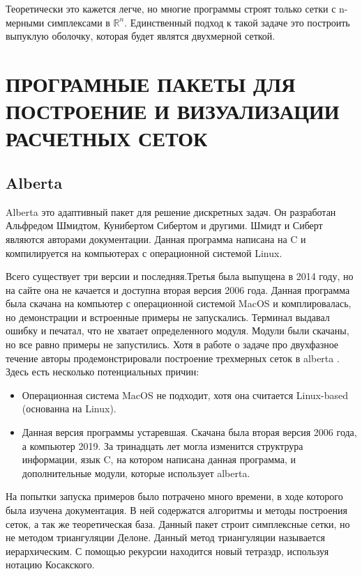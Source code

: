 Теоретически это кажется легче, но многие программы строят только сетки с n-мерными симплексами в $\mathbb{R}^{n}$. Единственный подход к такой задаче это построить выпуклую оболочку, которая будет являтся двухмерной сеткой. 

\chapter{ПРОГРАМНЫЕ ПАКЕТЫ ДЛЯ ПОСТРОЕНИЕ И ВИЗУАЛИЗАЦИИ РАСЧЕТНЫХ СЕТОК}
\section{Alberta}

Alberta это адаптивный пакет для решение дискретных задач. Он разработан Альфредом Шмидтом, Кунибертом Сибертом и другими. Шмидт и Сиберт являются авторами документации\cite{alberta}. Данная программа написана на C и компилируется на компьютерах с операционной системой Linux. 

Всего существует три версии и последняя.Третья была выпущена в 2014 году, но на сайте она не качается и доступна вторая версия 2006 года\cite{alcite}. Данная программа была скачана на компьютер с операционной системой MacOS и комплировалась, но демонстрации и встроенные примеры не запускались. Терминал выдавал ошибку и печатал, что не хватает определенного модуля. Модули были скачаны, но все равно примеры не запустились. Хотя в работе о задаче про двухфазное течение авторы продемонстрировали построение трехмерных сеток в alberta \cite[c.~35]{ns}. Здесь есть несколько потенциальных причин:
\begin{itemize}
    \item Операционная система MacOS не подходит, хотя она считается Linux-based (основанна на Linux). 
    \item Данная версия программы устаревшая. Скачана была вторая версия 2006 года, а компьютер 2019. За тринадцать лет могла изменится структрура информации, язык C, на котором написана данная программа, и дополнительные модули, которые использует alberta.
\end{itemize}

На попытки запуска примеров было потрачено много времени, в ходе которого была изучена документация. В ней содержатся алгоритмы и методы построения сеток, а так же теоретическая база\cite{alberta}. Данный пакет строит симплексные сетки, но не методом триангуляции Делоне. Данный метод триангуляции называется иерархическим. С помощью рекурсии находится новый тетраэдр, используя нотацию Косакского\cite[c.~4]{alberta}.

